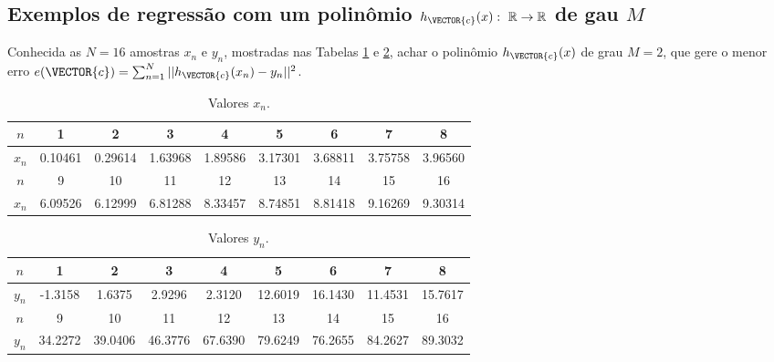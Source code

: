 \subsection{Exemplos de regressão com um polinômio
$h_{\VECTOR{c}}(x):~\mathbb{R} \rightarrow \mathbb{R}$ de gau $M$ }

\begin{example}\label{ex:theo:maphxr1r1}
Conhecida as $N=16$ amostras $x_n$ e $y_n$, mostradas nas  Tabelas \ref{table:theo:maphxr1r1:xn} e \ref{table:theo:maphxr1r1:yn},
achar o polinômio $h_{\VECTOR{c}}(x)$ de grau $M=2$, 
que gere o menor erro $e(\VECTOR{c}) =  \sum_{n=1}^{N} ||h_{\VECTOR{c}}(x_n)-y_n||^2$.
\end{example}


\begin{table}[h!]
\centering
\begin{tabular}{|c|c|c|c|c|c|c|c|c|} 
 \hline
$n$   & 1 & 2 & 3 & 4 & 5 & 6 & 7 & 8\\ \hline
$x_n$ & 0.10461 & 0.29614 & 1.63968 & 1.89586 & 3.17301 & 3.68811 & 3.75758 & 3.96560 \\ \hline
 \hline
$n$   & 9 & 10 & 11 & 12 & 13 & 14 & 15 & 16\\  \hline
$x_n$ & 6.09526 & 6.12999 & 6.81288 & 8.33457 & 8.74851 & 8.81418 & 9.16269 & 9.30314 \\ \hline
\end{tabular}
\caption{Valores $x_n$.}
\label{table:theo:maphxr1r1:xn}
\end{table}

\begin{table}[h!]
\centering
\begin{tabular}{|c|c|c|c|c|c|c|c|c|} 
 \hline
$n$   & 1 & 2 & 3 & 4 & 5 & 6 & 7 & 8\\ \hline
$y_n$ & -1.3158 & 1.6375 & 2.9296 & 2.3120 & 12.6019 & 16.1430 & 11.4531 & 15.7617  \\ \hline
 \hline
$n$   & 9 & 10 & 11 & 12 & 13 & 14 & 15 & 16\\  \hline
$y_n$ & 34.2272 & 39.0406 & 46.3776 & 67.6390 & 79.6249 & 76.2655 & 84.2627 & 89.3032 \\ \hline
\end{tabular}
\caption{Valores $y_n$.}
\label{table:theo:maphxr1r1:yn}
\end{table}

